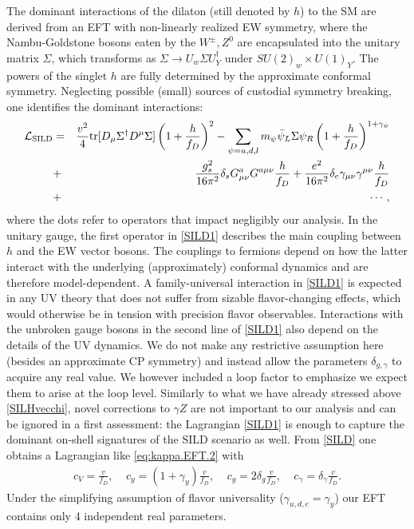 The dominant interactions of the dilaton (still denoted by $h$) to the SM are derived from an EFT with non-linearly realized EW symmetry, where the Nambu-Goldstone bosons eaten by the $W^\pm,Z^0$ are encapsulated into the unitary matrix $\Sigma$, which transforms as $\Sigma\to U_w\Sigma U_Y^\dagger$ under $SU(2)_w\times U(1)_Y$. The powers of the singlet $h$ are fully determined by the approximate conformal symmetry. Neglecting possible (small) sources of custodial symmetry breaking, one identifies the dominant interactions:~\cite{Goldberger:2008zz}
\begin{eqnarray}\label{SILD1}
{\cal L}_{\rm SILD}&=&\frac{v^2}{4}{\rm tr}[D_\mu\Sigma^\dagger D^\mu\Sigma]\left(1+\frac{h}{f_D}\right)^2-\sum_{\psi=u,d,l}m_\psi\bar\psi_L\Sigma\psi_R\left(1+\frac{h}{f_D}\right)^{1+\gamma_\psi}\\\nonumber
&+&\frac{g_s^2}{16\pi^2}\delta_sG^a_{\mu\nu}G^{a\mu\nu}\frac{h}{f_D}+\frac{e^2}{16\pi^2}\delta_e\gamma_{\mu\nu}\gamma^{\mu\nu}\frac{h}{f_D}\\\nonumber
&+&\cdots,
\end{eqnarray}
where the dots refer to operators that impact negligibly our analysis. In the unitary gauge, the first operator in \eqref{SILD1} describes the main coupling between $h$ and the EW vector bosons. The couplings to fermions depend on how the latter interact with the underlying (approximately) conformal dynamics and are therefore model-dependent. A family-universal interaction in \eqref{SILD1} is expected in any UV theory that does not suffer from sizable flavor-changing effects, which would otherwise be in tension with precision flavor observables. Interactions with the unbroken gauge bosons in the second line of \eqref{SILD1} also depend on the details of the UV dynamics. We do not make any restrictive assumption here (besides an approximate CP symmetry) and instead allow the parameters $\delta_{g,\gamma}$ to acquire any real value. We however included a loop factor to emphasize we expect them to arise at the loop level. Similarly to what we have already stressed above \eqref{SILHvecchi}, novel corrections to $\gamma Z$ are not important to our analysis and can be ignored in a first assessment: the Lagrangian \eqref{SILD1} is enough to capture the dominant on-shell signatures of the SILD scenario as well. From \eqref{SILD} one obtains a Lagrangian like \eqref{eq:kappa.EFT.2} with 
\begin{eqnarray}\label{4parSILD}
c_V=\frac{v}{f_D},~~~~~c_y=(1+\gamma_y)\frac{v}{f_D},~~~~~c_g=2\delta_g\frac{v}{f_D},~~~~~c_\gamma=\delta_\gamma\frac{v}{f_D}.
\end{eqnarray}
Under the simplifying assumption of flavor universality ($\gamma_{u,d,e}=\gamma_y$) our EFT contains only 4 independent real parameters. %



